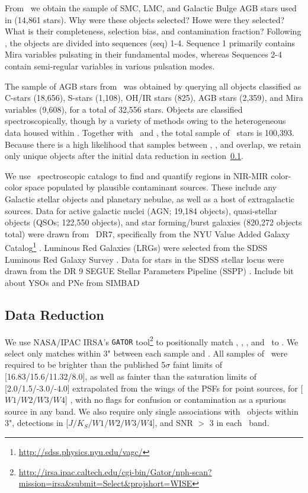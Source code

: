 From \macho\, we obtain the sample of SMC, LMC, and Galactic Bulge AGB stars used in \cite{2008AJ....136.1242F} (14,861 stars). {\color{red}Why were these objects selected? Howe were they selected? What is their completeness, selection bias, and contamination fraction?} Following \cite{2008AJ....136.1242F}, the objects are divided into sequences (seq) 1-4. Sequence 1 primarily contains Mira variables pulsating in their fundamental modes, whereas Sequences 2-4 contain semi-regular variables in various pulsation modes.

The sample of AGB stars from \simbad\, was obtained by querying all objects classified as C-stars (18,656), S-stars (1,108), OH/IR stars (825), AGB stars (2,359), and Mira variables (9,608), for a total of 32,556 stars. Objects are classified spectroscopically, though by a variety of methods owing to the heterogeneous data housed within \simbad. Together with \macho\, and \ogle, the total sample of \agb\, stars is 100,393. Because there is a high likelihood that samples between \ogle, \macho, and \simbad overlap, we retain only unique objects after the initial data reduction in section~\ref{sec:reduction}.

We use \sdss\, spectroscopic catalogs to find and quantify regions in NIR-MIR color-color space populated by plausible contaminant sources. These include any Galactic stellar objects and planetary nebulae, as well as a host of extragalactic sources. Data for active galactic nuclei (AGN; 19,184 objects), quasi-stellar objects (QSOs; 122,550 objects), and star forming/burst galaxies (820,272 objects total) were drawn from \sdss\, DR7, specifically from the NYU Value Added Galaxy Catalog\footnote{\url{http://sdss.physics.nyu.edu/vagc/}} \citep[VAGC]{2005AJ....129.2562B}. Luminous Red Galaxies (LRGs) were selected from the SDSS Luminous Red Galaxy Survey \citep[105,631 objects, ][]{2010ApJ...710.1444K}.  Data for stars in the SDSS stellar locus were drawn from the DR 9 SEGUE Stellar Parameters Pipeline (SSPP) \citep[1,843,190 objects, ][]{2012ApJS..203...21A}. {\color{red} Include bit about YSOs and PNe from SIMBAD}

\subsection{Data Reduction}
\label{sec:reduction}
We use NASA/IPAC IRSA's {\tt GATOR} tool\footnote{\url{http://irsa.ipac.caltech.edu/cgi-bin/Gator/nph-scan?mission=irsa&submit=Select&projshort=WISE}} to positionally match \sdss, \ogle, \macho, and \simbad\, to \allwise. We select only matches within 3" between  each sample and \allwise. All samples of \agb\, were required to be brighter than the published 5$\sigma$ faint limits of [16.83/15.6/11.32/8.0], as well as fainter than the saturation limits of [2.0/1.5/-3.0/-4.0] extrapolated from the wings of the PSFs for point sources, for [$W1/W2/W3/W4$] \citep{2013wise.rept....1C}, with no flags for confusion or contamination as a spurious source in any band. We also require only single associations with \twomass\, objects within 3", detections in [$J/K_S/W1/W2/W3/W4$], and SNR $>$ 3 in each \allwise\, band. 

